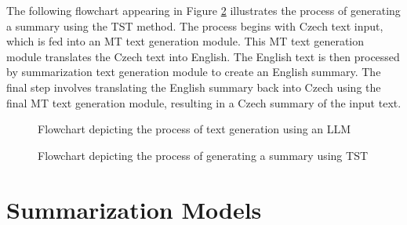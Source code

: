 \documentclass[english, ba, kiv, he, iso690numb, pdf, viewonly]{fasthesis}
\begin{document}
The following flowchart appearing in Figure \ref{fig:design2} illustrates the process of generating a summary using the TST method. The process begins with Czech text input, which is fed into an MT text generation module. This MT text generation module translates the Czech text into English. The English text is then processed by summarization text generation module to create an English summary. The final step involves translating the English summary back into Czech using the final MT text generation module, resulting in a Czech summary of the input text.
\begin{figure}[ht]
	\centering
	\caption{Flowchart depicting the process of text generation using an LLM}
	\setlength{\fboxsep}{10pt}
	\label{fig:design1}
\end{figure}

\begin{figure}[ht]
	\centering
	\caption{Flowchart depicting the process of generating a summary using TST}
	\setlength{\fboxsep}{10pt}
	\label{fig:design2}
\end{figure}

\section{Summarization Models}
\end{document}
